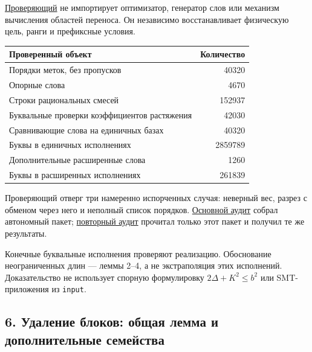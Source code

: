 \documentclass[
  11pt,
  a4paper,
]{article}
\begin{document}
\href{scripts/audit_multiset_nine_gap_cover.py}{Проверяющий} не
импортирует оптимизатор, генератор слов или механизм вычисления областей
переноса. Он независимо восстанавливает физическую цель, ранги и
префиксные условия.

\begin{longtable}[]{@{}lr@{}}
\toprule\noalign{}
Проверенный объект & Количество \\
\midrule\noalign{}
\endhead
\bottomrule\noalign{}
\endlastfoot
Порядки меток, без пропусков & 40320 \\
Опорные слова & 4670 \\
Строки рациональных смесей & 152937 \\
Буквальные проверки коэффициентов растяжения & 42030 \\
Сравнивающие слова на единичных базах & 40320 \\
Буквы в единичных исполнениях & 2859789 \\
Дополнительные расширенные слова & 1260 \\
Буквы в расширенных исполнениях & 261839 \\
\end{longtable}

Проверяющий отверг три намеренно испорченных случая: неверный вес,
разрез с обменом через него и неполный список порядков.
\href{literature/multiset_nine_gap_complete_audit_20260924.json}{Основной
аудит} собрал автономный пакет;
\href{literature/multiset_nine_gap_standalone_audit_20260924.json}{повторный
аудит} прочитал только этот пакет и получил те же результаты.

Конечные буквальные исполнения проверяют реализацию. Обоснование
неограниченных длин --- леммы 2--4, а не экстраполяция этих исполнений.
Доказательство не использует спорную формулировку \(2\Delta+K^2\le b^2\)
или SMT-приложения из \texttt{input}.

\hypertarget{ux443ux434ux430ux43bux435ux43dux438ux435-ux431ux43bux43eux43aux43eux432-ux43eux431ux449ux430ux44f-ux43bux435ux43cux43cux430-ux438-ux434ux43eux43fux43eux43bux43dux438ux442ux435ux43bux44cux43dux44bux435-ux441ux435ux43cux435ux439ux441ux442ux432ux430}{%
\subsection{6. Удаление блоков: общая лемма и дополнительные
семейства}\label{ux443ux434ux430ux43bux435ux43dux438ux435-ux431ux43bux43eux43aux43eux432-ux43eux431ux449ux430ux44f-ux43bux435ux43cux43cux430-ux438-ux434ux43eux43fux43eux43bux43dux438ux442ux435ux43bux44cux43dux44bux435-ux441ux435ux43cux435ux439ux441ux442ux432ux430}}
\end{document}

